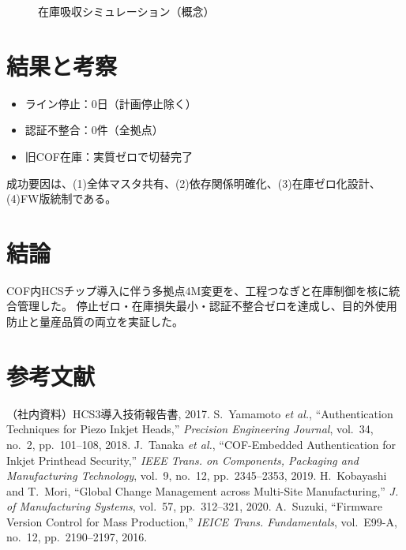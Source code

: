 \documentclass[journal,onecolumn]{IEEEtran}
\begin{document}
\begin{figure}[h]
\centering
{}
\caption{在庫吸収シミュレーション（概念）}
\end{figure}

\section{結果と考察}
\begin{itemize}
  \item ライン停止：0日（計画停止除く）
  \item 認証不整合：0件（全拠点）
  \item 旧COF在庫：実質ゼロで切替完了
\end{itemize}
成功要因は、(1)全体マスタ共有、(2)依存関係明確化、(3)在庫ゼロ化設計、(4)FW版統制である。

\section{結論}
COF内HCSチップ導入に伴う多拠点4M変更を、工程つなぎと在庫制御を核に統合管理した。
停止ゼロ・在庫損失最小・認証不整合ゼロを達成し、目的外使用防止と量産品質の両立を実証した。

\section*{参考文献}
\begin{thebibliography}{99}
 （社内資料）HCS3導入技術報告書, 2017.
 S.~Yamamoto \emph{et al.}, ``Authentication Techniques for Piezo Inkjet Heads,'' \emph{Precision Engineering Journal}, vol.~34, no.~2, pp.~101--108, 2018.
 J.~Tanaka \emph{et al.}, ``COF-Embedded Authentication for Inkjet Printhead Security,'' \emph{IEEE Trans. on Components, Packaging and Manufacturing Technology}, vol.~9, no.~12, pp.~2345--2353, 2019.
 H.~Kobayashi and T.~Mori, ``Global Change Management across Multi-Site Manufacturing,'' \emph{J. of Manufacturing Systems}, vol.~57, pp.~312--321, 2020.
 A.~Suzuki, ``Firmware Version Control for Mass Production,'' \emph{IEICE Trans. Fundamentals}, vol.~E99-A, no.~12, pp.~2190--2197, 2016.
\end{thebibliography}
\end{document}
